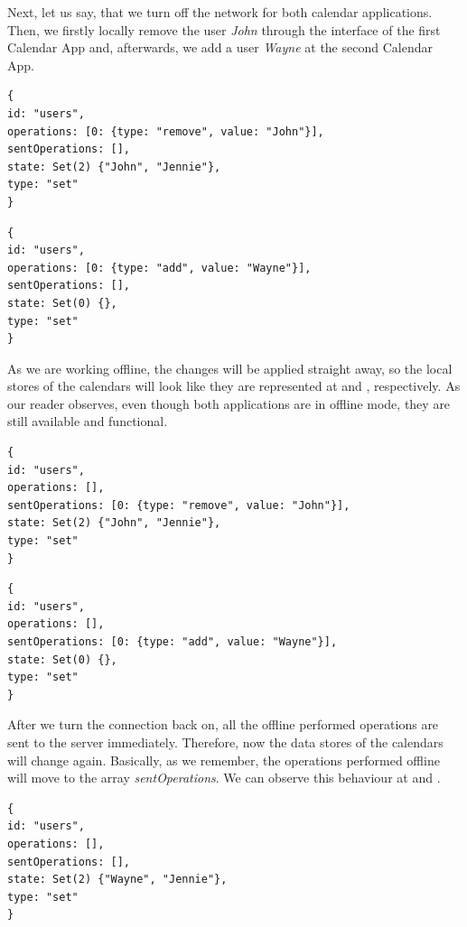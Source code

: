 Next, let us say, that we turn off the network for both calendar applications. Then, we firstly locally remove the user \textit{John} through the interface of the first Calendar App and, afterwards, we add a user \textit{Wayne} at the second Calendar App.

\begin{lstlisting}[caption={The state of the users object store after offline changes at the first Calendar App.}, label={lst:ev4}]
{
id: "users",
operations: [0: {type: "remove", value: "John"}],
sentOperations: [],
state: Set(2) {"John", "Jennie"},
type: "set"
}
\end{lstlisting}
\begin{lstlisting}[caption={The state of the users object store after offline changes at the second Calendar App.}, label={lst:ev5}]
{
id: "users",
operations: [0: {type: "add", value: "Wayne"}],
sentOperations: [],
state: Set(0) {},
type: "set"
}
\end{lstlisting}

As we are working offline, the changes will be applied straight away, so the local stores of the calendars will look like they are represented at  and , respectively. As our reader observes, even though both applications are in offline mode, they are still available and functional. 

\begin{lstlisting}[caption={The state of the users object store after the connection is enabled at the first Calendar App.}, label={lst:ev6}]
{
id: "users",
operations: [],
sentOperations: [0: {type: "remove", value: "John"}],
state: Set(2) {"John", "Jennie"},
type: "set"
}
\end{lstlisting}
\begin{lstlisting}[caption={The state of the users object store after the connection is enabled at the second Calendar App.}, label={lst:ev7}]
{
id: "users",
operations: [],
sentOperations: [0: {type: "add", value: "Wayne"}],
state: Set(0) {},
type: "set"
}
\end{lstlisting}

After we turn the connection back on, all the offline performed operations are sent to the server immediately. Therefore, now the data stores of the calendars will change again. Basically, as we remember, the operations performed offline will move to the array \textit{sentOperations}. We can observe this behaviour at  and .

\begin{lstlisting}[caption={The state of the users object store for both calendars.}, label={lst:ev8}]
{
id: "users",
operations: [],
sentOperations: [],
state: Set(2) {"Wayne", "Jennie"},
type: "set"
}
\end{lstlisting}

